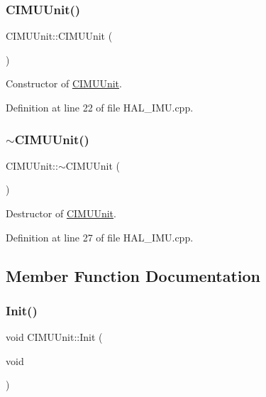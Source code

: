 \subsubsection{\texorpdfstring{C\+I\+M\+U\+Unit()}{CIMUUnit()}}
{\footnotesize\ttfamily C\+I\+M\+U\+Unit\+::\+C\+I\+M\+U\+Unit (\begin{DoxyParamCaption}{ }\end{DoxyParamCaption})}



Constructor of \mbox{\hyperlink{class_c_i_m_u_unit}{C\+I\+M\+U\+Unit}}. 



Definition at line 22 of file H\+A\+L\+\_\+\+I\+M\+U.\+cpp.

\mbox{\label{class_c_i_m_u_unit_ad1b0755d9d3f7f25abc660562eba6dfa}} 
\subsubsection{\texorpdfstring{$\sim$\+C\+I\+M\+U\+Unit()}{~CIMUUnit()}}
{\footnotesize\ttfamily C\+I\+M\+U\+Unit\+::$\sim$\+C\+I\+M\+U\+Unit (\begin{DoxyParamCaption}{ }\end{DoxyParamCaption})}



Destructor of \mbox{\hyperlink{class_c_i_m_u_unit}{C\+I\+M\+U\+Unit}}. 



Definition at line 27 of file H\+A\+L\+\_\+\+I\+M\+U.\+cpp.



\subsection{Member Function Documentation}
\mbox{\label{class_c_i_m_u_unit_a589ccc2afbaadbdf9dbef34c5025a42f}} 
\subsubsection{\texorpdfstring{Init()}{Init()}}
{\footnotesize\ttfamily void C\+I\+M\+U\+Unit\+::\+Init (\begin{DoxyParamCaption}\item[{void}]{ }\end{DoxyParamCaption})}



